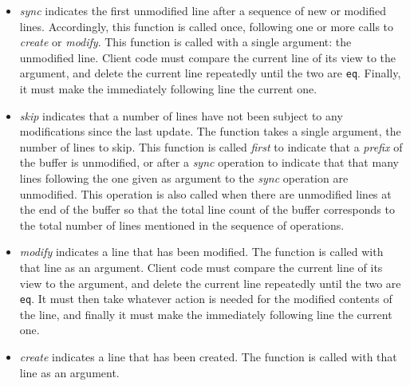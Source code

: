 \begin{itemize}
\item \textit{sync} indicates the first unmodified line after a
  sequence of new or modified lines.  Accordingly, this function is
  called once, following one or more calls to \textit{create} or
  \textit{modify}.  This function is called with a single argument:
  the unmodified line.  Client code must compare the current line of
  its view to the argument, and delete the current line repeatedly
  until the two are \texttt{eq}.  Finally, it must make the
  immediately following line the current one.
\item \textit{skip} indicates that a number of lines have not been
  subject to any modifications since the last update.  The function
  takes a single argument, the number of lines to skip.  This function
  is called \emph{first} to indicate that a \emph{prefix} of the
  buffer is unmodified, or after a \emph{sync} operation to indicate
  that that many lines following the one given as argument to the
  \textit{sync} operation are unmodified.  This operation is also
  called when there are unmodified lines at the end of the buffer so
  that the total line count of the buffer corresponds to the total
  number of lines mentioned in the sequence of operations.
\item \textit{modify} indicates a line that has been modified.  The
  function is called with that line as an argument.  Client code must
  compare the current line of its view to the argument, and delete the
  current line repeatedly until the two are \texttt{eq}.  It
  must then take whatever action is needed for the modified contents
  of the line, and finally it must make the immediately following line
  the current one.
\item \textit{create} indicates a line that has been created.  The
  function is called with that line as an argument.
\end{itemize}

